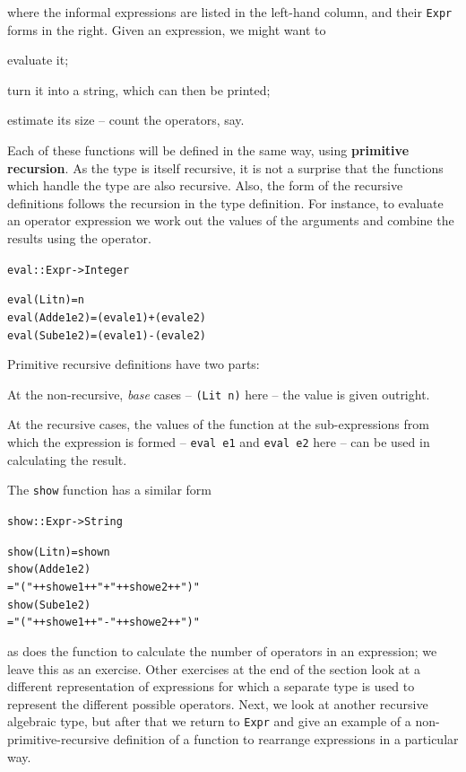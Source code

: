 \medskip
\noindent
where the informal expressions are listed in the left-hand column, and their
\texttt{Expr} forms in the right. Given an expression, we might want to
\begin{titemize}
\item evaluate it;
\item turn it into a string, which can then be printed;
\item estimate its size -- count the operators, say.
\end{titemize}
Each of these functions will be defined in the same way, using \textbf{primitive
recursion}.
As the type is itself recursive, it is not a surprise that the
functions which handle the type are also recursive. Also, the form of the
recursive definitions follows the recursion in the type definition. For
instance, to evaluate an operator expression we work out the values of the
arguments and combine the results using the operator.
\begin{alltt}
eval :: Expr -> Integer

eval (Lit n)     = n
eval (Add e1 e2) = (eval e1) + (eval e2)
eval (Sub e1 e2) = (eval e1) - (eval e2)
\end{alltt}
Primitive recursive definitions have two parts:
\begin{titemize}
\item At the non-recursive, {\em base\/} cases -- \texttt{(Lit n)} here -- the
value is given outright. 
\item At the recursive cases, the values of the function at the
sub-expressions from which the expression is formed -- \texttt{eval e1} and 
\texttt{eval e2} here -- can be used in
calculating the result. 
\end{titemize}
The \texttt{show} function has a similar form
\begin{alltt}
show :: Expr -> String

show (Lit n) = show n
show (Add e1 e2) 
  = "(" ++ show e1 ++ "+" ++ show e2 ++ ")"
show (Sub e1 e2) 
  = "(" ++ show e1 ++ "-" ++ show e2 ++ ")"
\end{alltt}
as does the function to calculate the number of operators in an expression;
we leave this as an exercise. Other exercises at the end of the section look
at a different representation of expressions for which a separate type is used
to represent the different possible operators. Next, we look at another
recursive algebraic type, but after that we return to \texttt{Expr} and give an
example of a non-primitive-recursive definition of a function to rearrange
expressions in a particular way.


